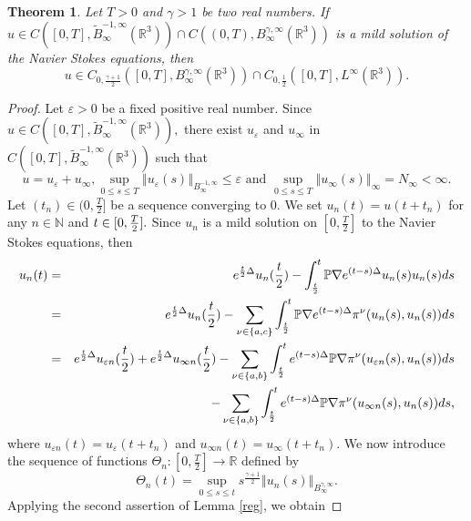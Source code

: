 \documentclass[11pt]{amsart}%
\theoremstyle{plain}
\numberwithin{equation}{section}
\newtheorem{theorem}{Theorem}[section]
\begin{document}
\begin{theorem}\label{lem}
Let $T>0$ and $\gamma >1$ be two real numbers. If $u\in C([0,T],\tilde{B}%
_{\infty }^{-1,\infty }(\mathbb{R}^{3}))\cap C((0,T),B_{\infty }^{\gamma
,\infty }(\mathbb{R}^{3}))$ is a mild solution of the Navier Stokes
equations, then
\[
u\in  C_{0,\frac{\gamma+1}{2}}([0,T],B^{\gamma,\infty}_\infty(\mathbb{R}^3))\cap C_{0,\frac{1}{2}}([0,T],L^\infty(\mathbb{R}^3)).
\]
\end{theorem}
\begin{proof}
Let $\varepsilon >0$ be a fixed positive real number. Since $u\in C([0,T],%
\tilde{B}_{\infty }^{-1,\infty }(\mathbb{R}^{3})),$ there exist $%
u_{\varepsilon }$ and $u_{\infty }$ in $C([0,T],\tilde{B}_{\infty
}^{-1,\infty }(\mathbb{R}^{3}))$ such that%
\[
u=u_{\varepsilon }+u_{\infty },\sup_{0\leq s\leq T}\left\Vert u_{\varepsilon
}(s)\right\Vert _{B_{\infty }^{-1,\infty }}\leq \varepsilon \text{ and }%
\sup_{0\leq s\leq T}\left\Vert u_{\infty }(s)\right\Vert _{\infty
}=N_{\infty }<\infty .
\]%
Let $(t_{n})\in (0,\frac{T}{2}]$ be a sequence converging to $0.$ We set
$u_{n}(t)=u(t+t_{n})$ for any $n\in \mathbb{N}$ and $t\in \lbrack 0,\frac{T}{%
2}].$ Since $u_{n}$ is a  mild solution on $[0,\frac{T}{2}]$ to the Navier
Stokes equations, then%
\begin{eqnarray}
u_{n}(t) &=&e^{\frac{t}{2}\Delta }u_{n}(\frac{t}{2})-\int_{\frac{t}{2}}^{t}%
\mathbb{P}\nabla e^{(t-s)\Delta }u_{n}(s)u_{n}(s)ds  \nonumber \\
&=&e^{\frac{t}{2}\Delta }u_{n}(\frac{t}{2})-\sum_{\nu \in \{a,c\}}\int_{%
\frac{t}{2}}^{t}\mathbb{P}\nabla e^{(t-s)\Delta }\pi ^{\nu
}(u_{n}(s),u_{n}(s))ds  \nonumber \\
&=&e^{\frac{t}{2}\Delta }u_{\varepsilon n}(\frac{t}{2})+e^{\frac{t}{2}\Delta
}u_{\infty n}(\frac{t}{2})-\sum_{\nu \in \{a,b\}}\int_{\frac{t}{2}%
}^{t}e^{(t-s)\Delta }\mathbb{P}\nabla \pi ^{\nu }(u_{\varepsilon
n}(s),u_{n}(s))ds  \nonumber \\
&&-\sum_{\nu \in \{a,b\}}\int_{\frac{t}{2}}^{t}e^{(t-s)\Delta }\mathbb{P}%
\nabla \pi ^{\nu }(u_{\infty n}(s),u_{n}(s))ds,  \label{IDE}
\end{eqnarray}%
where $u_{\varepsilon n}(t)=u_{\varepsilon }(t+t_{n})$ and $u_{\infty
n}(t)=u_{\infty }(t+t_{n}).$ We now introduce  the sequence of functions $%
\Theta _{n}:[0,\frac{T}{2}]\rightarrow \mathbb{R}$ defined by%
\[
\Theta _{n}(t)=\sup_{0\leq s\leq t}s^{\frac{\gamma +1}{2}}\left\Vert
u_{n}(s)\right\Vert _{B_{\infty }^{\gamma ,\infty }}.
\]%
Applying the second assertion of Lemma \ref{reg}, we obtain%

\end{proof}
\end{document}
